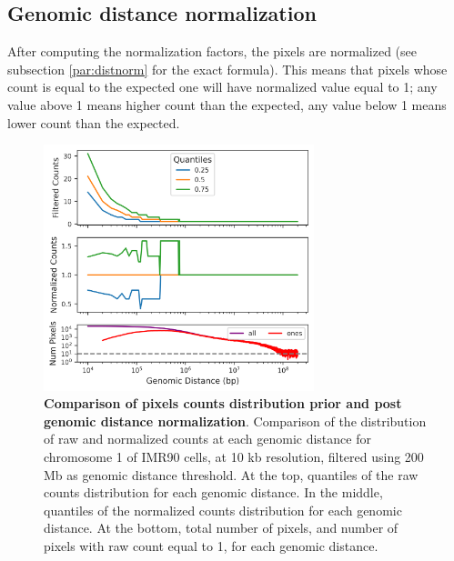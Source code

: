 \subsection{Genomic distance normalization}

After computing the normalization factors, the pixels are normalized (see subsection \ref{par:distnorm} for the exact formula). This means that pixels whose count is equal to the expected one will have normalized value equal to 1; any value above 1 means higher count than the expected, any value below 1 means lower count than the expected. 

\begin{figure}[ht]
  \centering
  \includegraphics[width=0.7\textwidth]{normalization_stats.png}
  \caption{\textbf{Comparison of pixels counts distribution prior and post genomic distance normalization}. Comparison of the distribution of raw and normalized counts at each genomic distance for chromosome 1 of IMR90 cells, at 10 kb resolution, filtered using 200 Mb as genomic distance threshold. At the top, quantiles of the raw counts distribution for each genomic distance. In the middle, quantiles of the normalized counts distribution for each genomic distance. At the bottom, total number of pixels, and number of pixels with raw count equal to 1, for each genomic distance.}
  \label{fig:normstats}
\end{figure}

